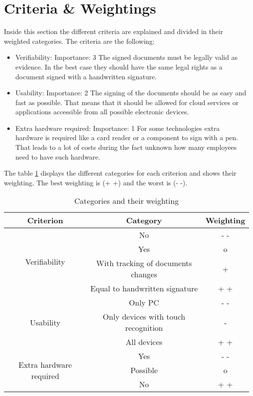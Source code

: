 \section{Criteria \& Weightings} \label{sec:criteria}
Inside this section the different criteria are explained and divided in their weighted categories. The criteria are the following:
\begin{itemize}
	\item Verifiability: \newline
	Importance: 3 \newline
	The signed documents must be legally valid as evidence. In the best case they should have the same legal rights as a document signed with a handwritten signature.
	\item Usability: \newline
	Importance: 2 \newline
	The signing of the documents should be as easy and fast as possible. That means that it should be allowed for cloud services or applications accessible from all possible electronic devices. 
	\item Extra hardware required: \newline
	Importance: 1 \newline
	For some technologies extra hardware is required like a card reader or a component to sign with a pen. That leads to a lot of costs during the fact unknown how many employees need to have such hardware.
\end{itemize} 

The table \ref{Tab:criteria} displays the different categories for each criterion and shows their weighting. The best weighting is (+ +) and the worst is (- -). 

\begin{table}[h]
	\centering
	\begin{tabular}{|c|c|c|} \hline
		\rowcolor{Gray}Criterion  & Category & Weighting \\ \hline
		\multirow{4}{*}{Verifiability} & No & - - \\ \cline{2-3}
									   & Yes & o \\ \cline{2-3}
									   & With tracking of documents changes & + \\ \cline{2-3}
									   & Equal to handwritten signature & + + \\ \cline{1-3}
		\multirow{3}{*}{Usability} & Only PC & - - \\ \cline{2-3}
		                           & Only devices with touch recognition & - \\ \cline{2-3}
								   & All devices & + + \\ \cline{1-3}
		\multirow{3}{*}{Extra hardware required} & Yes & - -\\ \cline{2-3}
												& Possible & o \\ \cline{2-3}
												& No & + +  \\ \cline{1-3}
	\end{tabular}
	\caption{Categories and their weighting}
	\label{Tab:criteria}
\end{table}